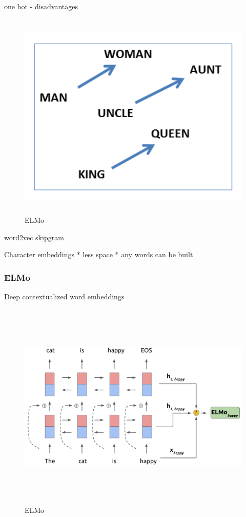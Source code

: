 \documentclass[a4paper, 11pt]{article}
\begin{document}
one hot - disadvantages

\begin{figure}[htpb]
    \centering
    \includegraphics[width=\textwidth,height=10cm,keepaspectratio=true]
    {word2vec-gender-relation.png}
    \caption{
        ELMo
    }
    \label{fig:ELMO}
\end{figure}

word2vec skipgram

Character embeddings
* less space
* any words can be built


\parencite{mikolov2013linguistic}


\subsubsection{ELMo}

Deep contextualized word embeddings

\parencite{peters2018deep}

\begin{figure}[htpb]
    \centering
    \includegraphics[width=\textwidth,height=10cm,keepaspectratio=true]
    {elmo.png}
    \caption{
        ELMo
    }
    \label{fig:ELMO}
\end{figure}
\end{document}
